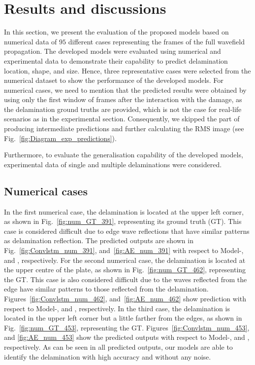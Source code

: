 \section{Results and discussions}
\begin{sloppypar}
	In this section, we present the evaluation of the proposed models based on numerical data of \(95\) different cases representing the frames of the full wavefield propagation. 
	The developed models were evaluated using numerical and experimental data to demonstrate their capability to predict delamination location, shape, and size.
	Hence, three representative cases were selected from the numerical dataset to show the performance of the developed models.
	For numerical cases, we need to mention that the predicted results were obtained by using only the first window of frames after the interaction with the damage, as the delamination ground truths are provided, which is not the case for real-life scenarios as in the experimental section. 
	Consequently, we skipped the part of producing intermediate predictions and further calculating the RMS image (see Fig.~\ref{fig:Diagram_exp_predictions}).
	
	Furthermore, to evaluate the generalisation capability of the developed models, experimental data of single and multiple delaminations were considered.
	
	\subsection{Numerical cases}
	In the first numerical case, the delamination is located at the upper left corner, as shown in Fig.~\ref{fig:num_GT_391}, representing its ground truth (GT).
	This case is considered difficult due to edge wave reflections that have similar patterns as delamination reflection.
	The predicted outputs are shown in Fig.~\ref{fig:Convlstm_num_391}, and~\ref{fig:AE_num_391} with respect to Model-, and , respectively.
	For the second numerical case, the delamination is located at the upper centre of the plate, as shown in Fig.~\ref{fig:num_GT_462}, representing the GT.
	This case is also considered difficult due to the waves reflected from the edge have similar patterns to those reflected from the delamination.
	Figures~\ref{fig:Convlstm_num_462}, and~\ref{fig:AE_num_462} show prediction with respect to Model-, and , respectively.
	In the third case, the delamination is located in the upper left corner but a little farther from the edges, as shown in Fig.~\ref{fig:num_GT_453}, representing the GT. 
	Figures~\ref{fig:Convlstm_num_453}, and \ref{fig:AE_num_453} show the predicted outputs with respect to Model-, and , respectively.
	As can be seen in all predicted outputs, our models are able to identify the delamination with high accuracy and without any noise.
	

\end{sloppypar}
